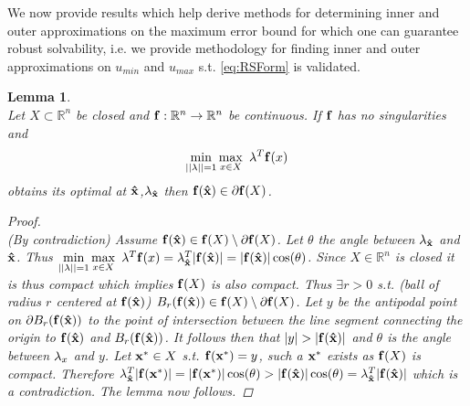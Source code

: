 \documentclass[11pt]{article}
\theoremstyle{plain}
\newtheorem{lem}[thm]{Lemma}
\theoremstyle{definition}
\theoremstyle{remark}
\begin{document}
We now provide results which help derive methods for determining inner and outer approximations on the maximum error bound for which one can guarantee robust solvability, i.e. we provide methodology for finding inner and outer approximations on $u_{min}$ and $u_{max}$ s.t. \eqref{eq:RSForm} is validated.\\

\begin{lem} \ \\
\label{MainInEqLem}
Let $X\subset\mathbb{R}^n$ be closed and $\bold{f}:\mathbb{R}^n\rightarrow\mathbb{R}^n$ be continuous. If $\bold{f}$ has no singularities and $$\min\limits_{||\bold{\lambda}||=1}\max\limits_{x\in X}\ \bold{\lambda}^T\bold{f}(x)$$
obtains its optimal at $\bold{\hat{x}}$,$\bold{\lambda}_{\bold{\hat{x}}}$ then $\bold{f}(\bold{\hat{x}})\in \partial \bold{f}(X)$. 

\begin{proof} \ \\
(By contradiction) Assume $\bold{f}(\bold{\hat{x}})\in \bold{f}(X)\setminus\partial \bold{f}(X)$. Let $\theta$ the angle between $\bold{\lambda}_{\bold{\hat{x}}}$ and $\bold{\hat{x}}$. Thus $\min\limits_{||\bold{\lambda}||=1}\max\limits_{x\in X}\ \bold{\lambda}^T\bold{f}(x)=\bold{\lambda}_{\bold{\hat{x}}}^T|\bold{f}(\bold{\hat{x}})|=|\bold{f}(\bold{\hat{x}})|\cos(\theta)$. Since $X\in\mathbb{R}^n$ is closed it is thus compact which implies $\bold{f}(X)$ is also compact. Thus $\exists r>0$ s.t. (ball of radius $r$ centered at $\bold{f}(\bold{\hat{x}})$) $B_r(\bold{f}(\bold{\hat{x}}))\in \bold{f}(X)\setminus\partial \bold{f}(X)$. Let $y$ be the antipodal point on $\partial B_r(\bold{f}(\bold{\hat{x}}))$ to the point of intersection between the line segment connecting the origin to $\bold{f}(\bold{\hat{x}})$ and $B_r(\bold{f}(\bold{\hat{x}}))$. It follows then that $|y|>|\bold{f}(\bold{\hat{x}})|$ and $\theta$ is the angle between $\bold{\lambda}_x$ and $y$.   Let $\bold{x^*}\in X$ s.t. $\bold{f}(\bold{x^*})=y$, such a $\bold{x^*}$ exists as $\bold{f}(X)$ is compact. Therefore $\bold{\lambda}_{\bold{\hat{x}}}^T|\bold{f}(\bold{x^*})|=|\bold{f}(\bold{x^*})|\cos(\theta)>|\bold{f}(\bold{\hat{x}})|\cos(\theta)=\bold{\lambda}_{\bold{\hat{x}}}^T|\bold{f}(\bold{\hat{x}})|$ which is a contradiction. 
The lemma now follows.
\end{proof}
\end{lem}
\end{document}
